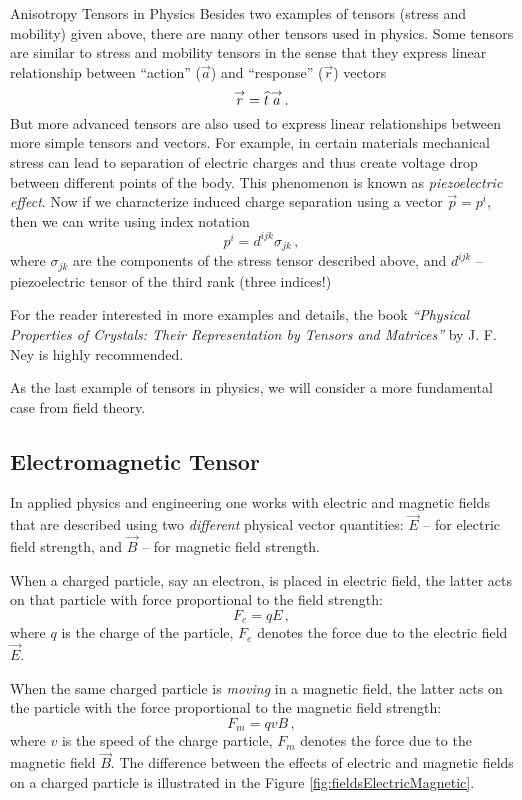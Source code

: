 \begin{mybio}{Anisotropy Tensors in Physics}
Besides two examples of tensors (stress and mobility) given above,
there are many other tensors used in physics. Some tensors are similar
to stress and mobility tensors in the sense that they express linear
relationship between ``action'' ($\vec{a}$) and ``response''
($\vec{r}$) vectors
\[
\overset{\rightarrow}{r} = \widehat{t}\,\overset{\rightarrow}{a}\,.
\]
But more advanced tensors are also used to express linear
relationships between more simple tensors and vectors. For example, in
certain materials mechanical stress can lead to separation of electric
charges and thus create voltage drop between different points of the
body. This phenomenon is known as \emph{piezoelectric effect}. Now if
we characterize induced charge separation using a vector $\vec{p}=p^i$,
then we can write using index notation
\[
p^i = d^{ijk}\sigma_{jk}\,,
\]
where $\sigma_{jk}$ are the components of the stress tensor described
above, and $d^{ijk}$ -- piezoelectric tensor of the third rank (three
indices!)

For the reader interested in more examples and details, the book
{\it ``Physical Properties of Crystals: Their Representation by Tensors and
Matrices''} by  J. F. Ney is highly recommended.
\end{mybio}
As the last example of tensors in physics, we will consider a more
fundamental case from field theory.

\subsection{Electromagnetic Tensor}
In applied physics and engineering one works with electric and
magnetic fields that are described using two \emph{different} physical vector
quantities: $\vec{E}$ -- for electric field strength, and $\vec{B}$
-- for magnetic field strength.

When a charged particle, say an electron, is placed in electric field,
the latter acts on that particle with force proportional to the field
strength:
\[
F_e = qE\,,
\]
where $q$ is the charge of the particle, $F_e$ denotes the force
due to the electric field $\vec{E}$.

When the same charged particle is \emph{moving} in a magnetic field, the
latter acts on the particle with the force proportional to the
magnetic field strength:
\[
F_m = qvB\,,
\]
where $v$ is the speed of the charge particle, $F_m$ denotes the force
due to the magnetic field $\vec{B}$. The difference between the
effects of electric and magnetic fields on a charged particle is
illustrated in the Figure \ref{fig:fieldsElectricMagnetic}.

